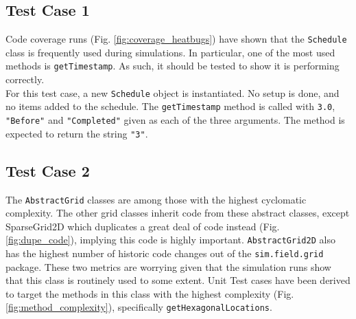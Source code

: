 \documentclass[11pt]{article}
\begin{document}
\subsection{Test Case 1}
Code coverage runs (Fig. \ref{fig:coverage_heatbugs}) have shown that the \texttt{Schedule} class is frequently used during simulations.
In particular, one of the most used methods is \texttt{getTimestamp}.
As such, it should be tested to show it is performing correctly.
\\

For this test case, a new \texttt{Schedule} object is instantiated.
No setup is done, and no items added to the schedule.
The \texttt{getTimestamp} method is called with \texttt{3.0}, \texttt{"Before"} and \texttt{"Completed"} given as each of the three arguments.
The method is expected to return the string \texttt{"3"}.

\subsection{Test Case 2}

The \texttt{AbstractGrid} classes are among those with the highest cyclomatic complexity.
The other grid classes inherit code from these abstract classes, except SparseGrid2D which duplicates a great deal of code instead (Fig. \ref{fig:dupe_code}), implying this code is highly important.
\texttt{AbstractGrid2D} also has the highest number of historic code changes out of the \texttt{sim.field.grid} package.
These two metrics are worrying given that the simulation runs show that this class is routinely used to some extent.
Unit Test cases have been derived to target the methods in this class with the highest complexity (Fig. \ref{fig:method_complexity}), specifically \texttt{getHexagonalLocations}.
\\
\end{document}
